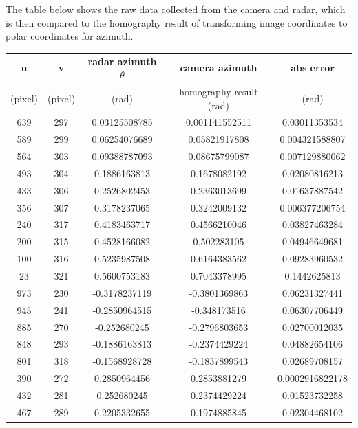 The table below shows the raw data collected from the camera and radar, 
which is then compared to the homography result of transforming image coordinates 
to polar coordinates for azimuth.
\begin{table}[htbp]
    \centering
    \begin{tabular}{|c|c|c|c|c|}
    \hline
    \textbf{u} & \textbf{v }  & \textbf{radar azimuth $\theta$} & \textbf{camera azimuth} & \textbf{abs error} \\ 
    (pixel)   &(pixel)          &(rad)                  &homography result (rad)&(rad)\\%
    \hline
        639 & 297 & 0.03125508785 & 0.001141552511 & 0.03011353534 \\
        589 & 299 & 0.06254076689 & 0.05821917808 & 0.004321588807 \\
        564 & 303 & 0.09388787093 & 0.08675799087 & 0.007129880062 \\
        493 & 304 & 0.1886163813 & 0.1678082192 & 0.02080816213 \\
        433 & 306 & 0.2526802453 & 0.2363013699 & 0.01637887542 \\
        356 & 307 & 0.3178237065 & 0.3242009132 & 0.006377206754 \\
        240 & 317 & 0.4183463717 & 0.4566210046 & 0.03827463284 \\
        200 & 315 & 0.4528166082 & 0.502283105 & 0.04946649681 \\
        100 & 316 & 0.5235987508 & 0.6164383562 & 0.09283960532 \\
        23 & 321 & 0.5600753183 & 0.7043378995 & 0.1442625813 \\
        973 & 230 & -0.3178237119 & -0.3801369863 & 0.06231327441 \\
        945 & 241 & -0.2850964515 & -0.348173516 & 0.06307706449 \\
        885 & 270 & -0.252680245 & -0.2796803653 & 0.02700012035 \\
        848 & 293 & -0.1886163813 & -0.2374429224 & 0.04882654106 \\
        801 & 318 & -0.1568928728 & -0.1837899543 & 0.02689708157 \\
        390 & 272 & 0.2850964456 & 0.2853881279 & 0.0002916822178 \\
        432 & 281 & 0.252680245 & 0.2374429224 & 0.01523732258 \\
        467 & 289 & 0.2205332655 & 0.1974885845 & 0.02304468102 \\

\end{tabular}
\end{table}
